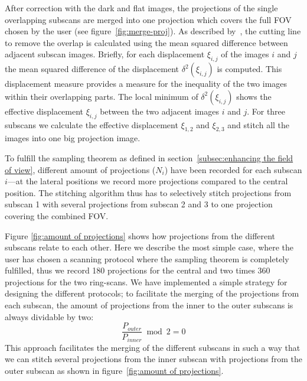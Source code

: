 After correction with the dark and flat images, the projections of the single overlapping subscans are merged into one projection which covers the full FOV chosen by the user (see figure~\ref{fig:merge-proj}). As described by~\citet{Hintermueller2009}, the cutting line to remove the overlap is calculated using the mean squared difference between adjacent subscan images. Briefly, for each displacement $\xi_{i,j}$ of the images $i$ and $j$ the mean squared difference of the displacement $\delta^2(\xi_{i,j})$ is computed. This displacement measure provides a measure for the inequality of the two images within their overlapping parts. The local minimum of $\delta^2(\xi_{i,j})$ shows the effective displacement $\xi_{i,j}$ between the two adjacent images $i$ and $j$. For three subscans we calculate the effective displacement $\xi_{1,2}$ and $\xi_{2,3}$ and stitch all the images into one big projection image.

To fulfill the sampling theorem as defined in section~\ref{subsec:enhancing the field of view}, different amount of projections ($N_{i}$) have been recorded for each subscan $i$---at the lateral positions we record more projections compared to the central position. The stitching algorithm thus has to selectively stitch projections from subscan 1 with several projections from subscan 2 and 3 to one projection covering the combined FOV.

Figure \ref{fig:amount of projections} shows how projections from the different subscans relate to each other. Here we describe the most simple case, where the user has chosen a scanning protocol where the sampling theorem is completely fulfilled, thus we record 180 projections for the central and two times 360 projections for the two ring-scans. We have implemented a simple strategy for designing the different protocols; to facilitate the merging of the projections from each subscan, the amount of projections from the inner to the outer subscans is always dividable by two: 
\begin{equation}
	\frac{P_{outer}}{P_{inner}} \bmod 2 = 0
\label{eq:Modulo}
\end{equation}
This approach facilitates the merging of the different subscans in such a way that we can stitch several projections from the inner subscan with projections from the outer subscan as shown in figure~\ref{fig:amount of projections}.

